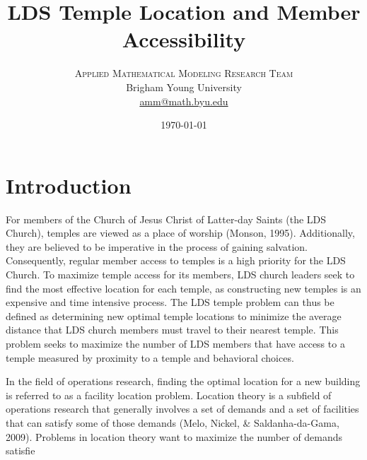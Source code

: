 \documentclass[twoside,twocolumn]{article}
\title{LDS Temple Location and Member Accessibility} %
\author{%
\textsc{Applied Mathematical Modeling Research Team}\\[1ex] %
\normalsize Brigham Young University  \\ %
\normalsize \href{mailto:amm@math.byu.edu}{amm@math.byu.edu} %
}
\date{\today} %
\begin{document}
\maketitle



\section{Introduction}


For members of the Church of Jesus Christ of Latter-day Saints (the LDS Church), temples are viewed as a place of worship (Monson, 1995).
Additionally, they are believed to be imperative in the process of gaining salvation.
Consequently, regular member access to temples is a high priority for the LDS Church.
To maximize temple access for its members, LDS church leaders seek to find the most effective location for each temple, as constructing new temples is an expensive and time intensive process.
The LDS temple problem can thus be defined as determining new optimal temple locations to minimize the average distance that LDS church members must travel to their nearest temple.
This problem seeks to maximize the number of LDS members that have access to a temple measured by proximity to a temple and behavioral choices.

In the field of operations research, finding the optimal location for a new building is referred to as a facility location problem.
Location theory is a subfield of operations research that generally involves a set of demands and a set of facilities that can satisfy some of those demands (Melo, Nickel, \& Saldanha-da-Gama, 2009).
Problems in location theory want to maximize the number of demands satisfie%
\end{document}
